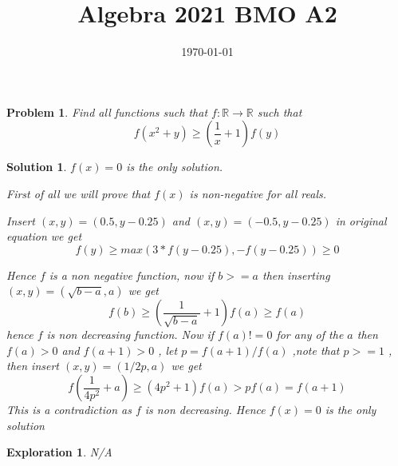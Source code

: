 \documentclass{article}
\title{Algebra 2021 BMO A2}
\date{\today}
\newtheorem*{problem}{Problem}
\newtheorem*{solution}{Solution}
\newtheorem*{exploration}{Exploration}
\begin{document}
	
	\maketitle
	
	\begin{problem}
		Find all functions such that \(f: \mathbb{R} \to \mathbb{R}  \) such that \\ 
		\[f(x^{2} + y) \geq \left(\frac{1}{x} + 1 \right)f(y)\]
	\end{problem}
	
	\begin{solution}
		$f(x)=0$ is the only solution.
		
		First of all we will prove that $f(x)$ is non-negative for all reals.
		
		Insert $(x,y) = (0.5,y-0.25)$ and $(x,y) = (-0.5, y-0.25) $ in original equation we get \[f(y) \geq max(3*f(y-0.25),-f(y-0.25)) \geq 0\]
		
		
		Hence $f$ is a non negative function, now if $b>=a$ then inserting $(x,y)=(\sqrt{b-a},a)$ we get 
		\[f(b) \geq (\frac{1 }{\sqrt{b-a}}+1)f(a)  \geq f(a) \]
		hence $f$  is non decreasing function.
		Now if $f(a) !=0 $ for any of the $a$ then $f(a)>0$ and $f(a+1)>0$ , let $p = f(a+1)/f(a)$ ,note that $p>=1 $ , then insert $(x,y)=(1/2p,a) $ we get  
		\[f(\frac{1}{4p^2}+a) \geq (4p^2 + 1)f(a)  > pf(a) = f(a+1) \] 
		This is a contradiction as $ f$ is non decreasing. Hence $f(x)=0$ is the only solution
	\end{solution}
	
	\begin{exploration}
		N/A
	\end{exploration}
	
\end{document}
